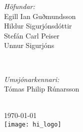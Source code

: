 \documentclass[12pt]{article}
\begin{document}
\begin{titlepage}
        \begin{minipage}{0.4\textwidth}
            \begin{flushleft} \large
                \emph{Höfundar:}\\
                Egill Ian Guðmundsson\\
                Hildur Sigurjónsdóttir\\
                Stefán Carl Peiser\\ %
				Unnur Sigurjóns
            \end{flushleft}
        \end{minipage}
        ~
        \begin{minipage}{0.4\textwidth}
            \begin{flushright} \large
                \emph{Umsjónarkennari:} \\
                Tómas Philip Rúnarsson\\
            \end{flushright}
        \end{minipage}\\[4cm]
        
        
        
        {\large \today}\\[3cm] %
        
        
       \texttt{[image: hi\_logo]}\\[1cm] %
        
        
        \vfill %
        
    \end{titlepage}
\end{document}
